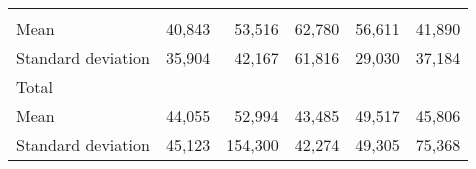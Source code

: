 \begin{tabular}{llllll}
  \multicolumn{1}{|r}{} &
  \multicolumn{1}{r}{} &
  \multicolumn{1}{r}{} &
  \multicolumn{1}{r}{} &
  \multicolumn{1}{r}{} \\
\multicolumn{1}{l}{\hspace{4em}Mean} &
  \multicolumn{1}{|r}{40,843} &
  \multicolumn{1}{r}{53,516} &
  \multicolumn{1}{r}{62,780} &
  \multicolumn{1}{r}{56,611} &
  \multicolumn{1}{r}{41,890} \\
\multicolumn{1}{l}{\hspace{4em}Standard deviation} &
  \multicolumn{1}{|r}{35,904} &
  \multicolumn{1}{r}{42,167} &
  \multicolumn{1}{r}{61,816} &
  \multicolumn{1}{r}{29,030} &
  \multicolumn{1}{r}{37,184} \\
\multicolumn{1}{l}{\hspace{3em}Total} &
  \multicolumn{1}{|r}{} &
  \multicolumn{1}{r}{} &
  \multicolumn{1}{r}{} &
  \multicolumn{1}{r}{} &
  \multicolumn{1}{r}{} \\
\multicolumn{1}{l}{\hspace{4em}Mean} &
  \multicolumn{1}{|r}{44,055} &
  \multicolumn{1}{r}{52,994} &
  \multicolumn{1}{r}{43,485} &
  \multicolumn{1}{r}{49,517} &
  \multicolumn{1}{r}{45,806} \\
\multicolumn{1}{l}{\hspace{4em}Standard deviation} &
  \multicolumn{1}{|r}{45,123} &
  \multicolumn{1}{r}{154,300} &
  \multicolumn{1}{r}{42,274} &
  \multicolumn{1}{r}{49,305} &
  \multicolumn{1}{r}{75,368} \\
\cline{1-6}
\end{tabular}

